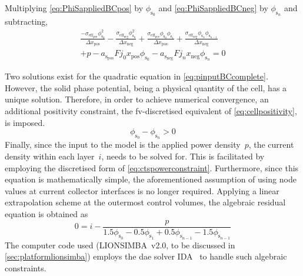     Multiplying    \cref{eq:PhiSappliedBCpos}    by   $\phi_{\text{s}_0}$    and
    \cref{eq:PhiSappliedBCneg} by $\phi_{\text{s}_n}$ and subtracting,
    \begin{multline} \label{eq:pinputBCcomplete}
        \frac{-\sigma_{\text{eff}_\text{pos}} \phi^2_{\text{s}_0}}{\Delta x_\text{pos}} -
        \frac{\sigma_{\text{eff}_\text{neg}} \phi^2_{\text{s}_n}}{\Delta x_\text{neg}} +
        \frac{\sigma_{\text{eff}_\text{pos}} \phi_{\text{s}_0} \phi_{\text{s}_1}}{\Delta x_\text{pos}} +
        \frac{\sigma_{\text{eff}_\text{neg}} \phi_{\text{s}_n} \phi_{\text{s}_{n-1}}}{\Delta x_\text{neg}} \\+ p -
        a_{\text{s}_\text{pos}} F j_0 x_\text{pos} \phi_{\text{s}_0} - a_{\text{s}_\text{neg}} F j_n x_\text{neg}
        \phi_{\text{s}_n} = 0
    \end{multline}


    Two     solutions     exist     for    the     quadratic     equation     in
    \cref{eq:pinputBCcomplete}.  However, the  solid  phase  potential, being  a
    physical quantity of the cell, has a unique solution. Therefore, in order to
    achieve  numerical convergence,  an  additional  positivity constraint,  the
    \gls{fv}-discretised equivalent of \cref{eq:cellpositivity}, is imposed.
    \begin{equation}\label{eq:discpositivity}
	    \phi_{\text{s}_0} - \phi_{\text{s}_n} > 0
    \end{equation}
    Finally,   since   the  input   to   the   model   is  the   applied   power
    density~$p$,  the  current  density  within  each  layer~$i$,  needs  to  be
    solved  for.  This   is  facilitated  by  employing   the  discretised  form
    of  \cref{eq:ctspowerconstraint}.   Furthermore,  since  this   equation  is
    mathematically simple, the aforementioned assumption of using node values at
    current  collector  interfaces is  no  longer  required. Applying  a  linear
    extrapolation  scheme  at  the  outermost  control  volumes,  the  algebraic
    residual equation is obtained as
    \begin{equation}\label{eq:currdensityresidual}
        0 = i - \frac{p}{1.5 \phi_{\mathrm{s}_0} - 0.5 \phi_{\mathrm{s}_1} + 0.5 \phi_{\mathrm{s}_{n-1}} - 1.5 \phi_{\mathrm{s}_{n-1}}}
    \end{equation}
    The    computer    code    used    (LIONSIMBA~v2.0,    to    be    discussed
    in    \cref{sec:platformlionsimba})    employs    the    \gls{dae}    solver
    IDA~\cite{sundials2005} to handle such algebraic constraints.

